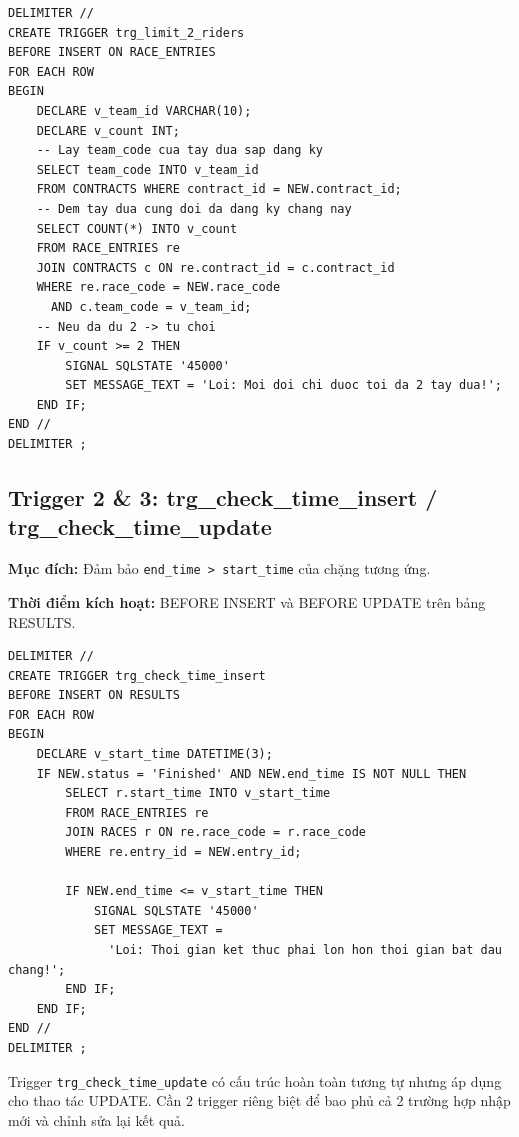 \documentclass[13pt, a4paper]{report}
\begin{document}
\begin{lstlisting}[caption={Trigger trg\_limit\_2\_riders --- Giới hạn 2 tay đua/đội/chặng}]
DELIMITER //
CREATE TRIGGER trg_limit_2_riders
BEFORE INSERT ON RACE_ENTRIES
FOR EACH ROW
BEGIN
    DECLARE v_team_id VARCHAR(10);
    DECLARE v_count INT;
    -- Lay team_code cua tay dua sap dang ky
    SELECT team_code INTO v_team_id 
    FROM CONTRACTS WHERE contract_id = NEW.contract_id;
    -- Dem tay dua cung doi da dang ky chang nay
    SELECT COUNT(*) INTO v_count 
    FROM RACE_ENTRIES re 
    JOIN CONTRACTS c ON re.contract_id = c.contract_id
    WHERE re.race_code = NEW.race_code 
      AND c.team_code = v_team_id;
    -- Neu da du 2 -> tu choi
    IF v_count >= 2 THEN
        SIGNAL SQLSTATE '45000' 
        SET MESSAGE_TEXT = 'Loi: Moi doi chi duoc toi da 2 tay dua!';
    END IF;
END //
DELIMITER ;
\end{lstlisting}

\subsection{Trigger 2 \& 3: trg\_check\_time\_insert / trg\_check\_time\_update}

\textbf{Mục đích:} Đảm bảo \texttt{end\_time > start\_time} của chặng tương ứng.

\textbf{Thời điểm kích hoạt:} BEFORE INSERT và BEFORE UPDATE trên bảng RESULTS.

\begin{lstlisting}[caption={Trigger kiểm tra tính hợp lệ của thời gian kết thúc}]
DELIMITER //
CREATE TRIGGER trg_check_time_insert
BEFORE INSERT ON RESULTS
FOR EACH ROW
BEGIN
    DECLARE v_start_time DATETIME(3);
    IF NEW.status = 'Finished' AND NEW.end_time IS NOT NULL THEN
        SELECT r.start_time INTO v_start_time 
        FROM RACE_ENTRIES re 
        JOIN RACES r ON re.race_code = r.race_code 
        WHERE re.entry_id = NEW.entry_id;
        
        IF NEW.end_time <= v_start_time THEN
            SIGNAL SQLSTATE '45000' 
            SET MESSAGE_TEXT = 
              'Loi: Thoi gian ket thuc phai lon hon thoi gian bat dau chang!';
        END IF;
    END IF;
END //
DELIMITER ;
\end{lstlisting}

\begin{notebox}
Trigger \texttt{trg\_check\_time\_update} có cấu trúc hoàn toàn tương tự nhưng áp dụng cho thao tác UPDATE. Cần 2 trigger riêng biệt để bao phủ cả 2 trường hợp nhập mới và chỉnh sửa lại kết quả.
\end{notebox}
\end{document}
